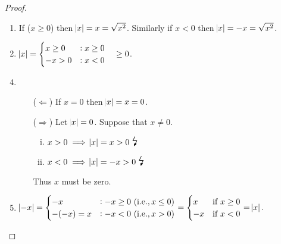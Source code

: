 \documentclass[11pt,openany]{article}
\begin{document}
\newpage
{}
\begin{proof}
\begin{enumerate}[(1)]
	\item If ($x\geq 0$) then $\abs{x}=x=\sqrt{x^2}$. Similarly if $x< 0$ then $\abs{x}=-x=\sqrt{x^2}$.
	\item $\abs{x}=\begin{cases}
		x\geq 0 &:x\geq 0\\
		-x>0 &:x<0
	\end{cases}\quad\geq 0$.
	\item[]
	\item \begin{itemize}
		\item[($\Leftarrow$)] If $x=0$ then $\abs{x}=x=0$.
		\item[($\Rightarrow$)] Let $\abs{x}=0$. Suppose that $x\neq0$. \begin{enumerate}[(i)]
			\item $x>0\implies \abs{x}=x>0\ \text{\Large\lightning}$
			\item $x<0\implies \abs{x}=-x>0\ \text{\Large\lightning}$
		\end{enumerate} Thus $x$ must be zero.
	\end{itemize}
	\newpage
	\item $\abs{-x}=\begin{cases}
		-x &: -x\geq 0\ (\textnormal{i.e.}, x\leq 0) \\
		-(-x)=x &: -x< 0\ (\textnormal{i.e.}, x> 0)
	\end{cases}=\begin{cases}
	x &\text{if}\ x\geq 0\\
	-x &\text{if}\ x<0
\end{cases}=\abs{x}$.

\end{enumerate}
\end{proof}
\end{document}
